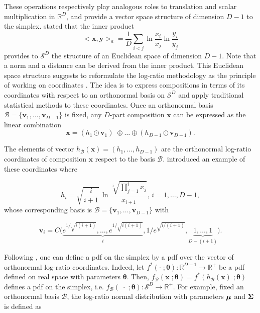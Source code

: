 \documentclass[12pt, a4paper]{article}
\newcommand{\m}[1]{\boldsymbol{#1}}
\begin{document}
These operations respectively play analogous roles to translation and scalar multiplication in $\mathbb{R}^D$, and provide a vector space
structure of dimension $D-1$ to the simplex. \cite{pawlowsky2001geometric} stated that the inner product 
\begin{equation}
<\textbf{x}, \textbf{y}>_a = \frac{1}{D} \sum_{i < j} \ln \frac{x_i}{x_j} \ln \frac{y_i}{y_j}
\label{inner_prod}
\end{equation}
 provides to $\mathcal{S}^D$ the structure of an Euclidean space of dimension $D-1$. Note that a norm and a distance can be derived from the inner product.
This Euclidean space structure suggests to reformulate the log-ratio methodology as the principle of working on coordinates \citep{figueras2011principle}. The idea is to express compositions in terms of its coordinates with respect to an orthonormal basis on $\mathcal{S}^D$ and apply
traditional statistical methods to these coordinates. Once an orthonormal basis $\mathcal{B} = \{\textbf{v}_1, \dots, \textbf{v}_{D-1}\}$ is fixed, any $D$-part composition $\textbf{x}$ can be expressed as the linear combination
\[
\textbf{x} = (h_1 \odot \textbf{v}_1)\; \oplus \dots  \oplus (h_{D-1} \odot \textbf{v}_{D-1}).
\]

The elements of vector $h_\mathcal{B}(\textbf{x})=(h_1, \dots, h_{D-1})$ are the orthonormal log-ratio coordinates of composition $\textbf{x}$ respect to the basis $\mathcal{B}$. \cite{egozcue2003isometric} introduced an example of these coordinates where

\begin{equation}
\label{eilr}
h_i=\sqrt{\frac{i}{i+1}}\,\ln\frac{\sqrt[i]
{\prod_{j=1}^{i} x_j}}{x_{i+1}},\,i=1,\dots,D-1,
\end{equation}
whose corresponding basis is $\mathcal{B} = \{\textbf{v}_1, \dots, \textbf{v}_{D-1}\}$ with

\[
\textbf{v}_i = C\Big( \underbrace{e^{1/\sqrt{i(i+1)}}, \dots, e^{1/\sqrt{i(i+1)}}}_{i}, 1/e^{\sqrt{ i/(i+1)}}, \underbrace{1, \dots, 1}_{D-(i+1)} \Big).
\]


Following \cite{mateu2013normal}, one can define a pdf on the simplex by a pdf over the vector of orthonormal log-ratio coordinates. Indeed, let $f^*(\cdot \;; \m\theta) : \mathbb{R}^{D-1} \rightarrow \mathbb{R}^+$ be a pdf defined on real space with parameters $\m\theta$. Then, $f_\mathcal{B}(\mathbf{x}\;; \m\theta) = f^*(h_\mathcal{B}(\textbf{x})\;; \m\theta)$ defines a pdf on the simplex, i.e. $f_\mathcal{B}(\;\cdot\;; \m\theta): \mathcal{S}^D \rightarrow \mathbb{R}^+$. For example, fixed an orthonormal basis $\mathcal{B}$, the log-ratio normal distribution with parameters $\mbox{\boldmath \(\mu\)}$ and $\mathbf{\Sigma}$ is defined as
\end{document}
